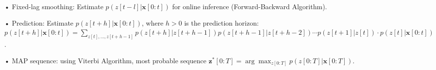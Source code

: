 \documentclass[12pt]{article}
\newcommand{\bulletPoint}[1]{\underline{\textit{\textbf{#1}}}}
\begin{document}
\begin{multicols*}{4}
• Fixed-lag smoothing: Estimate $p(z[t-l] | \mathbf{x}[0:t])$ for online inference ({Forward-Backward Algorithm}). 

• Prediction: Estimate $p(z[t+h] | \mathbf{x}[0:t])$, where $h > 0$ is the prediction horizon:
$p(z[t+h] | \mathbf{x}[0:t]) = \sum_{z[t],...,z[t+h-1]} p(z[t+h] | z[t+h-1]) p(z[t+h-1] | z[t+h-2]) \cdots p(z[t+1] | z[t]) \cdot p(z[t] | \mathbf{x}[0:t])$. 

• MAP sequence: using Viterbi Algorithm, most probable sequence $\mathbf{z}^*[0:T] = \arg\max_{z[0:T]} p(z[0:T] | \mathbf{x}[0:T])$.









\end{multicols*}
\end{document}
